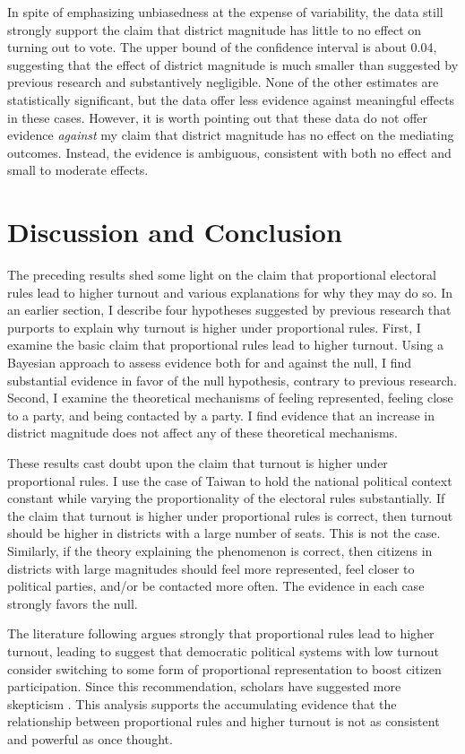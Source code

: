 \documentclass[12pt]{article}
\begin{document}
In spite of emphasizing unbiasedness at the expense of variability, the data still strongly support the claim that district magnitude has little to no effect on turning out to vote. The upper bound of the confidence interval is about 0.04, suggesting that the effect of district magnitude is much smaller than suggested by previous research and substantively negligible. None of the other estimates are statistically significant, but the data offer less evidence against meaningful effects in these cases. However, it is worth pointing out that these data do not offer evidence \textit{against} my claim that district magnitude has no effect on the mediating outcomes. Instead, the evidence is ambiguous, consistent with both no effect and small to moderate effects.  

\section*{Discussion and Conclusion}

The preceding results shed some light on the claim that proportional electoral rules lead to higher turnout and various explanations for why they may do so. In an earlier section, I describe four hypotheses suggested by previous research that purports to explain why turnout is higher under proportional rules. First, I examine the basic claim that proportional rules lead to higher turnout. Using a Bayesian approach to assess evidence both for and against the null, I find substantial evidence in favor of the null hypothesis, contrary to previous research. Second, I examine the theoretical mechanisms of feeling represented, feeling close to a party, and being contacted by a party. I find evidence that an increase in district magnitude does not affect any of these theoretical mechanisms.

These results cast doubt upon the claim that turnout is higher under proportional rules. I use the case of Taiwan to hold the national political context constant while varying the proportionality of the electoral rules substantially. If the claim that turnout is higher under proportional rules is correct, then turnout should be higher in districts with a large number of seats. This is not the case. Similarly, if the theory explaining the phenomenon is correct, then citizens in districts with large magnitudes should feel more represented, feel closer to political parties, and/or be contacted more often. The evidence in each case strongly favors the null.

The literature following \cite{Powell1986} argues strongly that proportional rules lead to higher turnout, leading \cite{Lijphart1997} to suggest that democratic political systems with low turnout consider switching to some form of proportional representation to boost citizen participation. Since this recommendation, scholars have suggested more skepticism \citep{BlaisAarts2006}. This analysis supports the accumulating evidence that the relationship between proportional rules and higher turnout is not as consistent and powerful as once thought. 
\end{document}
